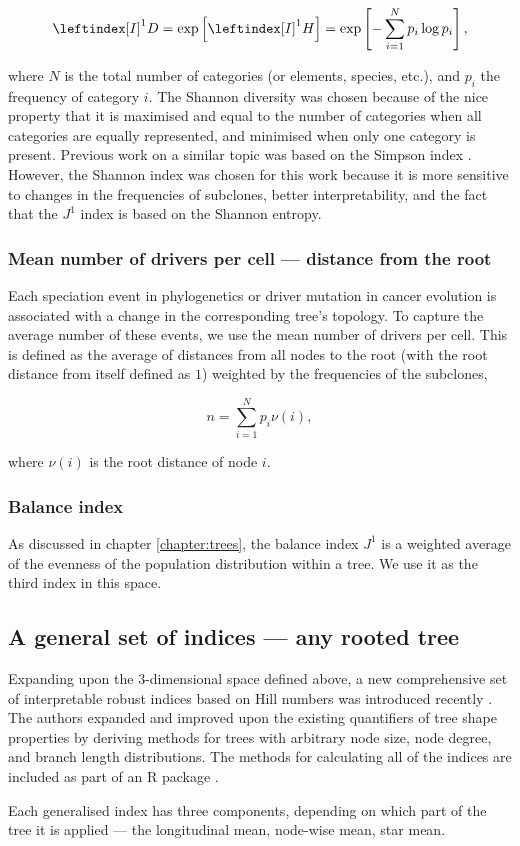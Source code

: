 \begin{equation}
    \leftindex[I]^1{D} = \exp\left[\leftindex[I]^1{H}\right] =
    \exp\left[-\sum_{i=1}^N p_i \log p_i\right],
\end{equation}

where $N$ is the total number of categories (or elements, species, etc.), and
$p_i$ the frequency of category $i$. The Shannon diversity was chosen because of
the nice property that it is maximised and equal to the number of categories
when all categories are equally represented, and minimised when only one
category is present. Previous work on a similar topic \cite{noble_spatial_2022}
was based on the Simpson index \cite{simpson_measurement_1949}. However, the
Shannon index was chosen for this work because it is more sensitive to changes
in the frequencies of subclones, better interpretability, and the fact that the
$J^1$ index is based on the Shannon entropy.

\subsubsection{Mean number of drivers per cell --- distance from the root}
Each speciation event in phylogenetics or driver mutation in cancer evolution is
associated with a change in the corresponding tree's topology. To capture the
average number of these events, we use the mean number of drivers per cell. This
is defined as the average of distances from all nodes to the root (with the root
distance from itself defined as $1$) weighted by the frequencies of the
subclones,

\begin{equation}
    n = \sum_{i=1}^N p_i \nu(i),
\end{equation}

where $\nu(i)$ is the root distance of node $i$.

\subsubsection{Balance index}
As discussed in chapter \ref{chapter:trees}, the balance index $J^1$ is a
weighted average of the evenness of the population distribution within a tree.
We use it as the third index in this space.

\subsection{A general set of indices --- any rooted tree}
Expanding upon the $3$-dimensional space defined above, a new comprehensive set
of interpretable robust indices based on Hill numbers was introduced recently
\cite{noble_new_2023}. The authors expanded and improved upon the existing
quantifiers of tree shape properties by deriving methods for trees with
arbitrary node size, node degree, and branch length distributions. The methods
for calculating all of the indices are included as part of an R package
\cite{kimverity_kimverityruiindices_2023}.\par Each generalised index has three
components, depending on which part of the tree it is applied --- the
longitudinal mean, node-wise mean, star mean.

